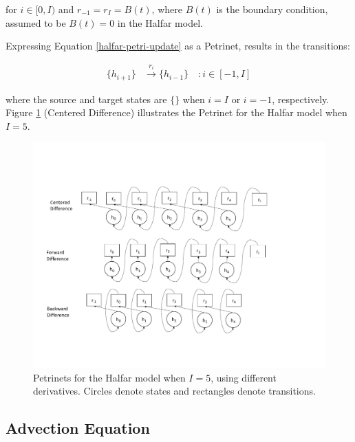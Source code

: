 \documentclass{article}
\begin{document}
\noindent for $i\in[0, I)$ and $r_{-1} = r_I = B(t)$, where $B(t)$ is the
boundary condition, assumed to be $B(t)= 0$ in the Halfar model.

Expressing Equation \ref{halfar-petri-update} as a Petrinet, results in the
transitions:


\begin{align}%
    \{h_{i+1}\} & \xrightarrow{r_i} \{h_{i-1}\} \quad : i \in [-1, I]
\end{align}

\noindent where the source and target states are $\{\}$ when $i = I$ or $i=-1$,
respectively.  Figure \ref{fig:halfar-petri} (Centered Difference) illustrates the Petrinet for the
Halfar model when $I=5$.

\begin{figure}[tbh]
    \includegraphics[width=\linewidth]{fig/halfar_petri.pdf}
    \caption{\label{fig:halfar-petri} Petrinets for the Halfar model when $I =
            5$, using different derivatives.  Circles denote states and rectangles denote transitions.}
\end{figure}

\subsection{Advection Equation}
\end{document}

